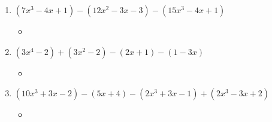 \begin{enumerate}
\item $(7x^{3}-4x+1)-(12x^{2}-3x-3)-(15x^{3}-4x+1)$
  \begin{itemize}
  \item 
  \end{itemize}
\item $(3x^{4}-2)+(3x^{2}-2)-(2x+1)-(1-3x)$
  \begin{itemize}
  \item 
  \end{itemize}
\item $(10x^{3}+3x-2)-(5x+4)-(2x^{3}+3x-1)+(2x^{3}-3x+2)$
  \begin{itemize}
  \item 
  \end{itemize}
\end{enumerate}
